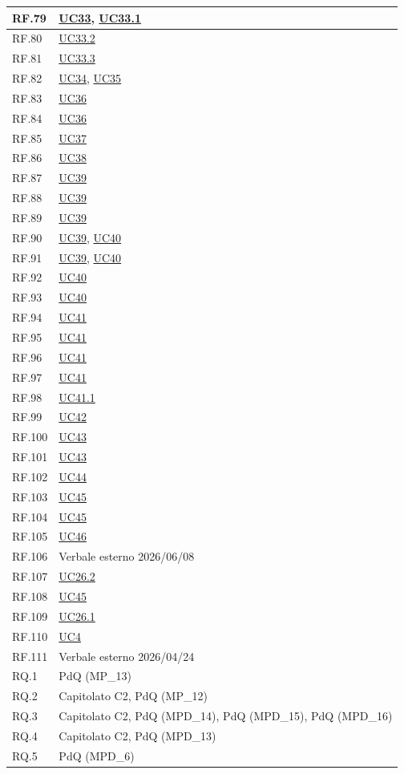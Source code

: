\documentclass[12pt, a4paper]{article}
\begin{document}
\begin{longtable}{|l|p{}|}
RF.79 & \hyperref[uc:33]{UC33}, \hyperref[uc:33.1]{UC33.1} \\ \hline
RF.80 & \hyperref[uc:33.2]{UC33.2} \\ \hline
RF.81 & \hyperref[uc:33.3]{UC33.3} \\ \hline
RF.82 & \hyperref[uc:34]{UC34}, \hyperref[uc:35]{UC35} \\ \hline
RF.83 & \hyperref[uc:36]{UC36} \\ \hline
RF.84 & \hyperref[uc:36]{UC36} \\ \hline
RF.85 & \hyperref[uc:37]{UC37} \\ \hline
RF.86 & \hyperref[uc:38]{UC38} \\ \hline
RF.87 & \hyperref[uc:39]{UC39} \\ \hline
RF.88 & \hyperref[uc:39]{UC39} \\ \hline
RF.89 & \hyperref[uc:39]{UC39} \\ \hline
RF.90 & \hyperref[uc:39]{UC39}, \hyperref[uc:40]{UC40} \\ \hline
RF.91 & \hyperref[uc:39]{UC39}, \hyperref[uc:40]{UC40} \\ \hline
RF.92 & \hyperref[uc:40]{UC40} \\ \hline
RF.93 & \hyperref[uc:40]{UC40} \\ \hline
RF.94 & \hyperref[uc:41]{UC41} \\ \hline
RF.95 & \hyperref[uc:41]{UC41} \\ \hline
RF.96 & \hyperref[uc:41]{UC41} \\ \hline
RF.97 & \hyperref[uc:41]{UC41} \\ \hline
RF.98 & \hyperref[uc:41.1]{UC41.1} \\ \hline
RF.99 & \hyperref[uc:42]{UC42} \\ \hline
RF.100 & \hyperref[uc:43]{UC43} \\ \hline
RF.101 & \hyperref[uc:43]{UC43} \\ \hline
RF.102 & \hyperref[uc:44]{UC44} \\ \hline
RF.103 & \hyperref[uc:45]{UC45} \\ \hline
RF.104 & \hyperref[uc:45]{UC45} \\ \hline
RF.105 & \hyperref[uc:46]{UC46} \\ \hline
RF.106 & Verbale esterno 2026/06/08 \\ \hline
RF.107 & \hyperref[uc:26.2]{UC26.2} \\ \hline
RF.108 & \hyperref[uc:45]{UC45} \\ \hline
RF.109 & \hyperref[uc:26.1]{UC26.1} \\ \hline
RF.110 & \hyperref[uc:4]{UC4} \\ \hline
RF.111 & Verbale esterno 2026/04/24 \\ \hline
RQ.1 & PdQ (MP\_13) \\ \hline
RQ.2 & Capitolato C2, PdQ (MP\_12) \\ \hline
RQ.3 & Capitolato C2, PdQ (MPD\_14), PdQ (MPD\_15), PdQ (MPD\_16) \\ \hline
RQ.4 & Capitolato C2, PdQ (MPD\_13) \\ \hline
RQ.5 & PdQ (MPD\_6) \\ \hline


\end{longtable}
\end{document}
